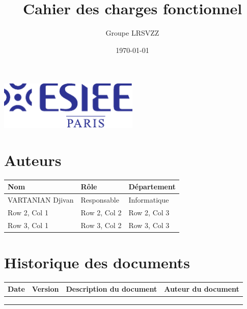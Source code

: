 \documentclass[a4paper,12pt]{report}  %
\title{Cahier des charges fonctionnel}
\author{Groupe LRSVZZ}
\date{\today}
\begin{document}
	

	\begin{titlepage}
		\centering
		\vspace*{9cm} 
		{\LARGE \bfseries \thetitle \par}
		\vspace{1cm} 
		\large \theauthor \par
		\vspace{0.5cm} 
		\large \thedate \par
		\vspace{5cm} 
		\includegraphics[width=0.5\textwidth]{../Design/FichiersPoster/Logo_ESIEE.pdf} 
		\vfill 
	\end{titlepage}
	
	
	
	\section*{Auteurs}
	
	\renewcommand{\arraystretch}{1.5}  %
	\begin{table}[h]
		\begin{tabularx}{\textwidth}{|X|X|X|}  %
			\hline
			\textbf{Nom} & \textbf{Rôle} & \textbf{Département} \\
			\hline
			VARTANIAN Djivan & Responsable & Informatique \\
			\hline
			Row 2, Col 1 & Row 2, Col 2 & Row 2, Col 3 \\
			\hline
			Row 3, Col 1 & Row 3, Col 2 & Row 3, Col 3 \\
			\hline
		\end{tabularx}
	\end{table}
	
	\section*{Historique des documents}
	\begin{table}[h]
		\begin{tabular}{|c|c|c|c|} 
			\hline
			\textbf{Date} & \textbf{Version} & \textbf{Description du document} & \textbf{Auteur du document} \\
			\hline
			& & & \\
			\hline
			& & & \\
			\hline
			& & & \\
			\hline
		\end{tabular}
	\end{table}
	
\end{document}

